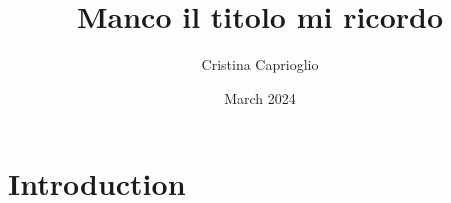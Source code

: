\documentclass[]{article}
\title{Manco il titolo mi ricordo}
\author{Cristina Caprioglio}
\date{March 2024 }
\begin{document}
\maketitle
\begin{abstract}
	

\end{abstract}	
\section{Introduction}

	
\end{document}
